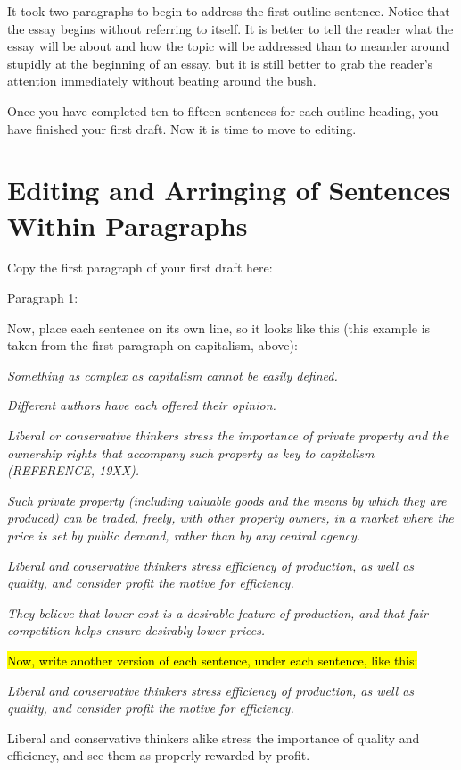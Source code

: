 \documentclass{article}
\begin{document}
It took two paragraphs to begin to address the first outline sentence.
Notice that the essay begins without referring to itself. It is better
to tell the reader what the essay will be about and how the topic will
be addressed than to meander around stupidly at the beginning of an
essay, but it is still better to grab the reader's attention immediately
without beating around the bush.

Once you have completed ten to fifteen sentences for each outline
heading, you have finished your first draft. Now it is time to move to
editing.

\section{Editing and Arringing of Sentences Within Paragraphs}

Copy the first paragraph of your first draft here:

Paragraph 1:

Now, place each sentence on its own line, so it looks like this (this
example is taken from the first paragraph on capitalism, above):

\emph{Something as complex as capitalism cannot be easily defined.}

\emph{Different authors have each offered their opinion.}

\emph{Liberal or conservative thinkers stress the importance of private
property and the ownership rights that accompany such property as key to
capitalism (REFERENCE, 19XX).}

\emph{Such private property (including valuable goods and the means by
which they are produced) can be traded, freely, with other property
owners, in a market where the price is set by public demand, rather than
by any central agency.}

\emph{Liberal and conservative thinkers stress efficiency of production,
as well as quality, and consider profit the motive for efficiency.}

\emph{They believe that lower cost is a desirable feature of production,
and that fair competition helps ensure desirably lower prices.}

\hl{Now, write another version of each sentence, under each sentence,
like this:}

\emph{Liberal and conservative thinkers stress efficiency of production,
as well as quality, and consider profit the motive for efficiency.}

Liberal and conservative thinkers alike stress the importance of quality
and efficiency, and see them as properly rewarded by profit.
\end{document}
